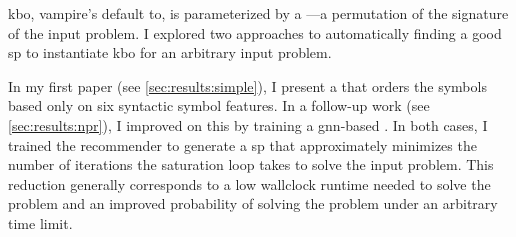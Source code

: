 \Gls{kbo}, \gls{vampire}'s default \gls{to}, is parameterized by a ---a permutation of the \gls{signature} of the input problem.
I explored two approaches to automatically finding a good \gls{sp} to instantiate \gls{kbo} for an arbitrary input problem.

In my first paper \cite{DBLP:conf/cade/Bartek020} (see \cref{sec:results:simple}),
I present a  that orders the symbols based only on six syntactic symbol features.
In a follow-up work \cite{DBLP:conf/cade/Bartek021} (see \cref{sec:results:npr}),
I improved on this by training a \acrshort{gnn}-based .
In both cases, I trained the recommender to generate a \gls{sp} that
approximately minimizes the number of iterations the saturation loop takes to solve the input problem.
This reduction generally corresponds to
a low \gls{wallclock} \gls{runtime} needed to solve the problem and
an improved probability of solving the problem under an arbitrary time limit.



